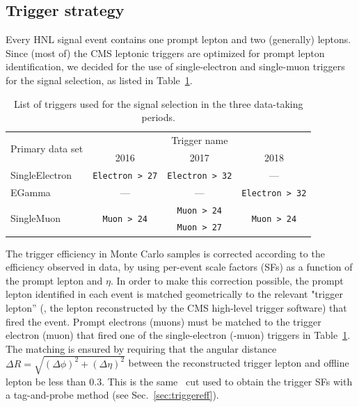 \subsection{Trigger strategy}\label{sec:trigger}
Every HNL signal event contains one prompt lepton and two (generally)
\displ leptons. Since (most of) the CMS leptonic triggers are
optimized for prompt lepton identification,
we decided for the use of single-electron and single-muon triggers for the
signal selection, as listed in Table~\ref{tab:sgnlTriggers}.
\begin{table}[h]
{\small
  \begin{center}
    \caption{\label{tab:sgnlTriggers} List of triggers used for the
      signal selection in the three data-taking periods.}
      \begin{tabular}{|l|c|c|c|}
      \hline
      \multirow{2}{*}{Primary data set} & \multicolumn{3}{c|}{Trigger name}\\
      \cline{2-4}
      & 2016 & 2017 & 2018 \\
      \hline\hline
      SingleElectron & \texttt{\scriptsize Electron > 27} & \texttt{\scriptsize Electron > 32} & --- \\
      \hline
      EGamma         & --- & --- & \texttt{\scriptsize Electron > 32} \\
      \hline
      \multirow{2}{*}{SingleMuon} & \multirow{2}{*}{\texttt{\scriptsize Muon > 24}} & \texttt{\scriptsize Muon > 24} & \multirow{2}{*}{\texttt{\scriptsize Muon > 24}} \\
      & & \texttt{\scriptsize Muon > 27} & \\
      \hline
    \end{tabular}    
  \end{center}}
\end{table}

The trigger efficiency in  Monte Carlo samples is corrected
according to the efficiency observed in data, by using per-event scale
factors (SFs) as a function of the prompt lepton \pt and $\eta$.
In order to make this correction possible, the prompt lepton
identified in each event is matched geometrically to the relevant
"trigger lepton'' (\ie, the lepton reconstructed by the CMS
high-level trigger software) that fired the event. Prompt electrons
(muons) must be matched to the trigger electron (muon) that fired one
of the single-electron (-muon) triggers in
Table~\ref{tab:sgnlTriggers}.
The matching is ensured by requiring that the angular distance
\(\Delta R=\sqrt{\left(\Delta\phi\right)^2+\left(\Delta\eta\right)^2}\) 
between the reconstructed trigger lepton and offline lepton be less
than 0.3. This is the same \DR\ cut used to obtain the trigger SFs
with a tag-and-probe method (see Sec.~\ref{sec:triggereff}).

